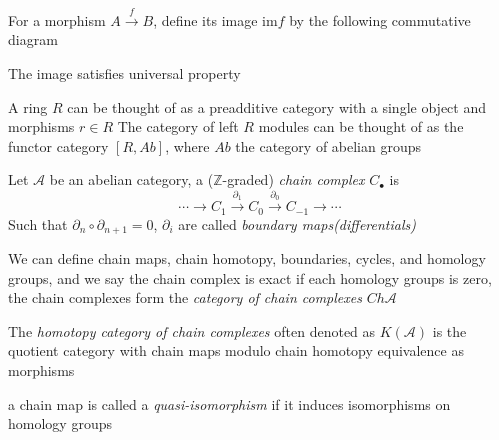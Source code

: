 \documentclass[main]{subfiles}
\begin{document}
\begin{definition}
For a morphism $A\xrightarrow{f}B$, define its image $\mathrm{im}f$ by the following commutative diagram
\begin{center}
\end{center}
The image satisfies universal property
\begin{center}
\end{center}
\end{definition}

\begin{example}
A ring $R$ can be thought of as a preadditive category with a single object and morphisms $r\in R$
The category of left $R$ modules can be thought of as the functor category $[R,Ab]$, where $Ab$ the category of abelian groups
\end{example}

\begin{definition}
Let $\mathscr A$ be an abelian category, a ($\mathbb Z$-graded) \textit{chain complex} $C_\bullet$ is 
\[\cdots\to C_{1}\xrightarrow{\partial_1}C_0\xrightarrow{\partial_0}C_{-1}\to\cdots\]
Such that $\partial_{n}\circ\partial_{n+1}=0$, $\partial_i$ are called \textit{boundary maps(differentials)} \par
We can define chain maps, chain homotopy, boundaries, cycles, and homology groups, and we say the chain complex is exact if each homology groups is zero, the chain complexes form the \textit{category of chain complexes} $Ch\mathscr A$ \par
The \textit{homotopy category of chain complexes} often denoted as $K(\mathscr A)$ is the quotient category with chain maps modulo chain homotopy equivalence as morphisms \par
a chain map is called a \textit{quasi-isomorphism} if it induces isomorphisms on homology groups \par
\end{definition}
\end{document}
